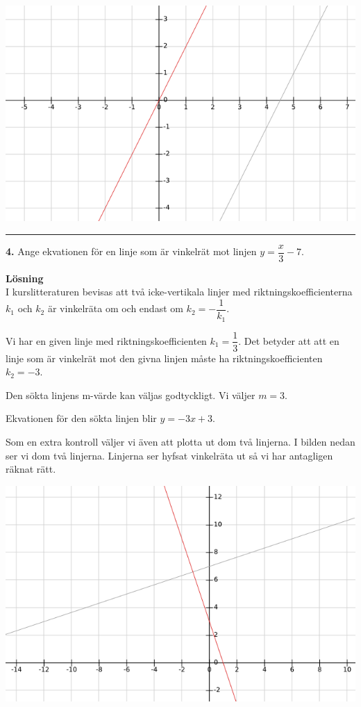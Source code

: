 \documentclass{article}
\begin{document}
\includegraphics[scale=0.65]{graph_1_3_1.png} 

\noindent\rule[0.5ex]{\linewidth}{0.5pt}
\textbf{4.} Ange ekvationen för en linje som är vinkelrät mot linjen $y=\dfrac{x}{3}-7$.

\textbf{Lösning}\\
I kurslitteraturen bevisas att två icke-vertikala linjer med riktningskoefficienterna $k_{1}$ och $k_{2}$ är vinkelräta om och endast om $k_{2} = -\dfrac{1}{k_{1}}$.

Vi har en given linje med riktningskoefficienten $k_{1} = \dfrac{1}{3}$. Det betyder att att en linje som är vinkelrät mot den givna linjen måste ha  riktningskoefficienten $k_{2}=-3$.

Den sökta linjens m-värde kan väljas godtyckligt. Vi väljer $m = 3$.

Ekvationen för den sökta linjen blir $y = -3x + 3$.

Som en extra kontroll väljer vi även att plotta ut dom två linjerna. I bilden nedan ser vi dom två linjerna. Linjerna ser hyfsat vinkelräta ut så vi har antagligen räknat rätt.

\includegraphics[scale=0.65]{graph_1_4_1.png}
\end{document}

